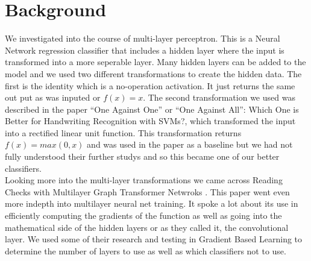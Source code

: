 
\section{Background}
\label{sec:background}

We investigated into the course of multi-layer perceptron. This is a
Neural Network regression classifier that includes a hidden layer
where the input is transformed into a more seperable layer. Many
hidden layers can be added to the model and we used two different
transformations to create the hidden data. The first is the identity
which is a no-operation activation. It just returns the same out put
as was inputed or $f(x)=x$. The second transformation we used was
described in the paper “One Against One” or “One Against All”: Which One is
Better for Handwriting Recognition with SVMs?, which transformed the
input into a rectified linear unit function.\cite{milgram} This
transformation returns $f(x)=max(0,x)$ and was used in the paper as a
baseline but we had not fully understood their further studys and so this became one of our better classifiers. \\

Looking more into the multi-layer transformations we came across
Reading Checks with Multilayer Graph Transformer Netwroks
\cite{cun}. This paper went even more indepth into multilayer neural
net training. It spoke a lot about its use in efficiently computing
the gradients of the function as well as going into the mathematical
side of the hidden layers or as they called it, the convolutional
layer. We used some of their research and testing in Gradient Based
Learning to determine the number of layers to use as well as which
classifiers not to use. \\




